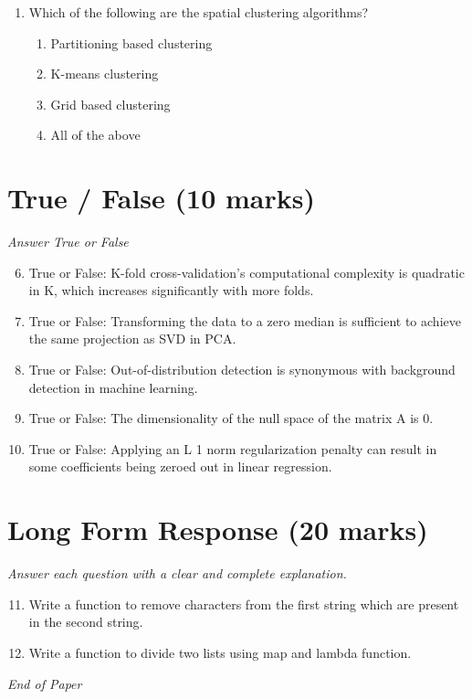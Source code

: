 \documentclass[12pt]{article}
\begin{document}
\begin{enumerate}[label=\arabic*.]
\begin{enumerate}[label=(\alph*)]
    \item P(B) decreases
    \item All of above
\end{enumerate}
\item Which of the following are the spatial clustering algorithms?
\begin{enumerate}[label=(\alph*)]
    \item Partitioning based clustering
    \item K-means clustering
    \item Grid based clustering
    \item All of the above
\end{enumerate}
\end{enumerate}

\section*{True / False (10 marks)}
\textit{Answer True or False}
\begin{enumerate}[label=\arabic*.]
\setcounter{enumi}{5}
\item True or False: K-fold cross-validation's computational complexity is quadratic in K, which increases significantly with more folds.
\item True or False: Transforming the data to a zero median is sufficient to achieve the same projection as SVD in PCA.
\item True or False: Out-of-distribution detection is synonymous with background detection in machine learning.
\item True or False: The dimensionality of the null space of the matrix A is 0.
\item True or False: Applying an L 1 norm regularization penalty can result in some coefficients being zeroed out in linear regression.
\end{enumerate}

\section*{Long Form Response (20 marks)}
\textit{Answer each question with a clear and complete explanation.}
\begin{enumerate}[label=\arabic*.]
\setcounter{enumi}{10}
\item Write a function to remove characters from the first string which are present in the second string.
\item Write a function to divide two lists using map and lambda function.
\end{enumerate}

\vfill
\noindent\textit{End of Paper}
\end{document}
